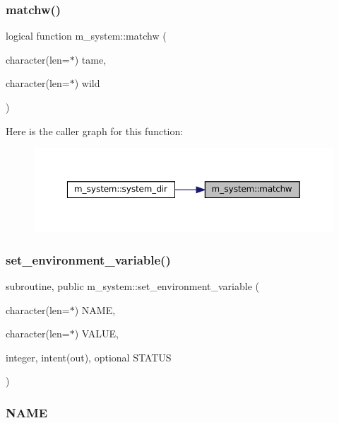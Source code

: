 \subsubsection{\texorpdfstring{matchw()}{matchw()}}
{\footnotesize\ttfamily logical function m\+\_\+system\+::matchw (\begin{DoxyParamCaption}\item[{character(len=$\ast$)}]{tame,  }\item[{character(len=$\ast$)}]{wild }\end{DoxyParamCaption})}

Here is the caller graph for this function\+:\nopagebreak
\begin{figure}[H]
\begin{center}
\leavevmode
\includegraphics[width=350pt]{namespacem__system_a0fccb69d0a56044b05e85b8df9f90aea_icgraph}
\end{center}
\end{figure}
\mbox{\label{namespacem__system_ad813765403a5d9d6fb7a2edcb669fe4b}} 
\subsubsection{\texorpdfstring{set\+\_\+environment\+\_\+variable()}{set\_environment\_variable()}}
{\footnotesize\ttfamily subroutine, public m\+\_\+system\+::set\+\_\+environment\+\_\+variable (\begin{DoxyParamCaption}\item[{character(len=$\ast$)}]{N\+A\+ME,  }\item[{character(len=$\ast$)}]{V\+A\+L\+UE,  }\item[{integer, intent(out), optional}]{S\+T\+A\+T\+US }\end{DoxyParamCaption})}



\subsubsection*{N\+A\+ME}

